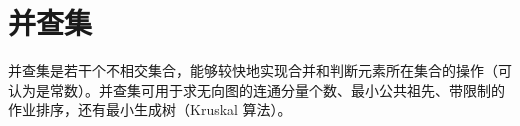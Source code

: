 \section{并查集}
	并查集是若干个不相交集合，能够较快地实现合并和判断元素所在集合的操作（可认为是常数）。并查集可用于求无向图的连通分量个数、最小公共祖先、带限制的作业排序，还有最小生成树（Kruskal 算法）。
	
    
    
